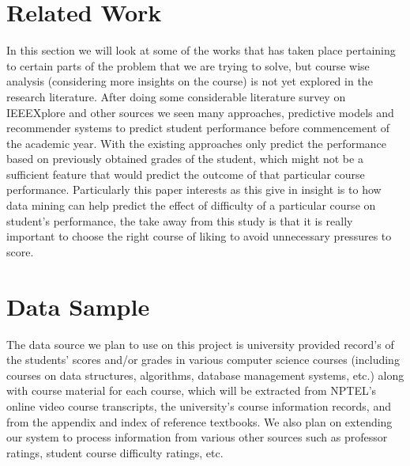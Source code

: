 \documentclass[conference]{IEEEtran}
\begin{document}
	\section{Related Work}
In this section we will look at some of the works that has taken place pertaining to certain parts of the problem that we are trying to solve, but course wise analysis (considering more insights on the course) is not yet explored in the research literature. After doing some considerable literature survey on IEEEXplore\cite{ieee} and other sources\cite{googleSch} we seen many approaches, predictive models and recommender systems to predict student performance before commencement of the academic year. \cite{ref:1} \cite{ref:2} \cite{ref:3} With the existing approaches only predict the performance based on previously obtained grades of the student, which might not be a sufficient feature that would predict the outcome of that particular course performance. Particularly this paper\cite{ref:3} interests as this give in insight is to how data mining can help predict the effect of difficulty of a particular course on student's performance, the take away from this study is that it is really important to choose the right course of liking to avoid unnecessary pressures to score.

	\section{Data Sample}
The data source we plan to use on this project is university provided record's of the students' scores and/or grades in various computer science courses (including courses on data structures, algorithms, database management systems, etc.) along with course material for each course, which will be extracted from NPTEL's online video course transcripts, the university's course information records, and from the appendix and index of reference textbooks. We also plan on extending our system to process information from various other sources such as professor ratings, student course difficulty ratings, etc.
\end{document}
